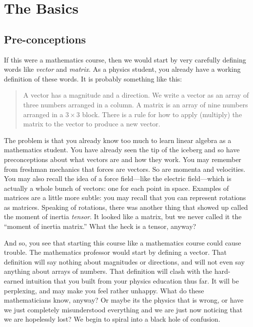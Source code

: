 
\chapter{The Basics}\label{ch:basics}


\section{Pre-conceptions}

If this were a mathematics course, then we would start by very carefully defining words like \emph{vector} and \emph{matrix}. As a physics student, you already have a working definition of these words. It is probably something like this:
%
\begin{quote}
A vector has a magnitude and a direction. We write a vector as an array of three numbers arranged in a column. A matrix is an array of nine numbers arranged in a $3\times 3$ block. There is a rule for how to apply (multiply) the matrix to the vector to produce a new vector.
\end{quote}

The problem is that you already know too much to learn linear algebra as a mathematics student. You have already seen the tip of the iceberg and so have preconceptions about what vectors are and how they work. You may remember from freshman mechanics that forces are vectors. So are momenta and velocities. You may also recall the idea of a force field---like the electric field---which is actually a whole bunch of vectors: one for each point in space. Examples of matrices are a little more subtle: you may recall that you can represent rotations as matrices. Speaking of rotations, there was another thing that showed up called the moment of inertia \emph{tensor}. It looked like a matrix, but we never called it the ``moment of inertia matrix.'' What the heck is a tensor, anyway?

And so, you see that starting this course like a mathematics course could cause trouble. The mathematics professor would start by defining a vector. That definition will say nothing about magnitudes or directions, and will not even say anything about arrays of numbers. That definition will clash with the hard-earned intuition that you built from your physics education thus far. It will be perplexing, and may make you feel rather unhappy. What do these mathematicians know, anyway? Or maybe its the physics that is wrong, or have we just completely misunderstood everything and we are just now noticing that we are hopelessly lost? We begin to spiral into a black hole of confusion.

